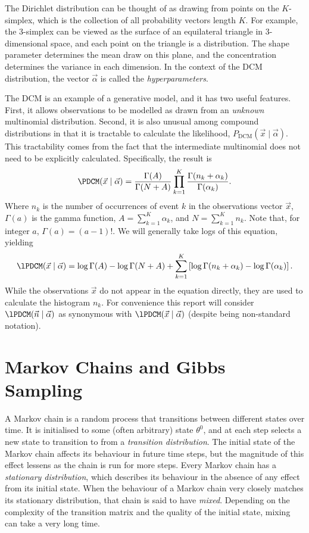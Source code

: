 The Dirichlet distribution can be thought of as drawing from points on the $K$-simplex, which is the collection of all probability vectors length $K$. For example, the 3-simplex can be viewed as the surface of an equilateral triangle in 3-dimensional space, and each point on the triangle is a distribution. The shape parameter determines the mean draw on this plane, and the concentration determines the variance in each dimension. In the context of the DCM distribution, the vector $\vec \alpha$ is called the \emph{hyperparameters}.

The DCM is an example of a generative model, and it has two useful features. First, it allows observations to be modelled as drawn from an \emph{unknown} multinomial distribution. Second, it is also unusual among compound distributions in that it is tractable to calculate the likelihood, $P_\text{DCM}(\vec x \mid \vec \alpha)$. This tractability comes from the fact that the intermediate multinomial does not need to be explicitly calculated. Specifically, the result is \begin{equation}
 \PDCM (\vec x \mid \vec \alpha) = \frac{\Gamma(A)}{\Gamma(N + A)} \prod_{k=1}^K \frac{\Gamma(n_k + \alpha_k)}{\Gamma(\alpha_k)} . \label{e:DCM}
\end{equation}
Where $n_k$ is the number of occurrences of event $k$ in the observations vector $\vec x$, $\Gamma(a)$ is the gamma function, $A = \sum_{k=1}^K \alpha_k$, and $N = \sum_{k=1}^K n_k$. Note that, for integer $a$, $\Gamma(a) = (a-1)!$. We will generally take logs of this equation, yielding \begin{equation}
 \lPDCM (\vec x \mid \vec \alpha) = \log \Gamma(A) - \log \Gamma(N + A) + \sum_{k=1}^K \left[ \log\Gamma(n_k + \alpha_k) - \log \Gamma(\alpha_k) \right] . \label{e:logDCM}
\end{equation}
While the observations $\vec x$ do not appear in the equation directly, they are used to calculate the histogram $n_k$. For convenience this report will consider $\lPDCM(\vec n \mid \vec \alpha)$ as synonymous with $\lPDCM(\vec x \mid \vec \alpha)$ (despite being non-standard notation).

\section{Markov Chains and Gibbs Sampling} \label{s:markov_background}

A Markov chain is a random process that transitions between different states over time. It is initialised to some (often arbitrary) state $\theta^0$, and at each step selects a new state to transition to from a \emph{transition distribution}. The initial state of the Markov chain affects its behaviour in future time steps, but the magnitude of this effect lessens as the chain is run for more steps. Every Markov chain has a \emph{stationary distribution}, which describes its behaviour in the absence of any effect from its initial state. When the behaviour of a Markov chain very closely matches its stationary distribution, that chain is said to have \emph{mixed}. Depending on the complexity of the transition matrix and the quality of the initial state, mixing can take a very long time.

